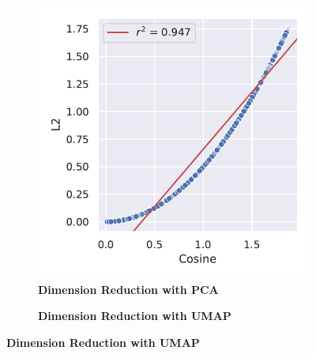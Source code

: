 \begin{figure}
    \centering
    \begin{adjustbox}{minipage=\dimexpr{}\fboxrule,fbox}
        \begin{subfigure}[b]{0.475\textwidth}
            \caption[Dimension Reduction with \Acrshort{PCA}]{\textbf{Dimension Reduction with \Acrshort{PCA}}}
            \label{subfig:Normalisation_PCA}            \includegraphics[width=\textwidth]{PCA/Difference_Distance_Calculation.pdf}
        \end{subfigure}
        \hfill
        \begin{subfigure}[b]{0.475\textwidth}
            \caption[Dimension Reduction with \Acrshort{UMAP}]{\textbf{Dimension Reduction with \Acrshort{UMAP}}}

\end{subfigure}
\end{adjustbox}
\end{figure}
